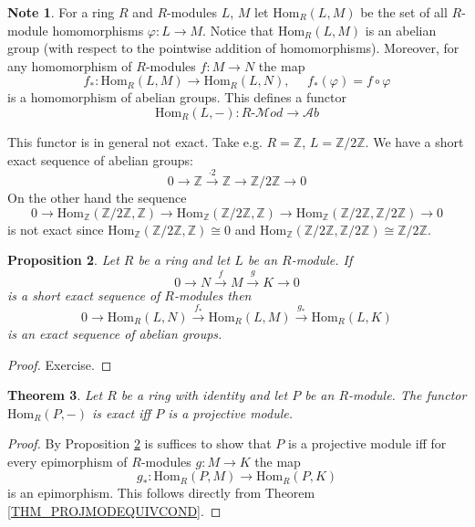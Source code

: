 \documentclass[12pt, letterpaper, oneside]{article}
\theoremstyle{plain}
\newtheorem{theorem}{Theorem}[section]
\newtheorem{proposition}[theorem]{Proposition}
\theoremstyle{definition}
\newtheorem{note}[theorem]{Note}
\newcommand{\lra}{\longrightarrow}
\newcommand{\Z}{{\mathbb Z}}
\newcommand{\Hom}{\mathrm{Hom}}
\newcommand{\Ab}{{\mathcal Ab}}
\newcommand{\Mod}{{\mathcal Mod}}
\newcommand{\vs}{\vskip 5mm}
\begin{document}
\vs\vs



\begin{note}
For  a ring $R$ and $R$-modules  $L$, $M$ let $\Hom_{R}(L, M)$ be the set  
of all $R$-module homomorphisms $\varphi\colon L \to M$. Notice that  $\Hom_{R}(L, M)$
is an abelian group (with respect to the pointwise addition of homomorphisms). Moreover, 
for any homomorphism of $R$-modules $f\colon M \to N$ the map 
$$f_{\ast}\colon \Hom_{R}(L, M) \to \Hom_{R}(L, N), \ \ \ \ \ \ f_{\ast}(\varphi) =  f \circ \varphi$$
is a homomorphism of abelian groups. 
This defines  a functor
$$\Hom_{R}(L, - )\colon  \text{$R$-$\Mod$} \lra \Ab$$

This functor is in general not exact. Take e.g. $R= \Z$, $L= \Z/2\Z$. We have a short 
exact sequence of abelian groups:
$$0\to \Z \overset{\cdot 2}{\lra} \Z \lra \Z/2\Z \to 0 $$
On the other hand the sequence 
$$0\to \Hom_{\Z}(\Z/2\Z, \Z) \lra \Hom_{\Z}(\Z/2\Z,\Z) \lra \Hom_{\Z}(\Z/2\Z,\Z/2\Z) \to 0 $$
is not exact since $ \Hom_{\Z}(\Z/2\Z, \Z) \cong 0$ and $\Hom_{\Z}(\Z/2\Z,\Z/2\Z)\cong \Z/2\Z$.
\end{note}



\vs\vs

\begin{proposition}
\label{PROP_HOML-LEFTEXACT}
Let $R$ be a ring and let $L$ be an $R$-module. If 
$$ 0 \lra N \overset{f}{\lra} M \overset{g}{\lra} K \lra 0$$
is a short exact sequence of $R$-modules then 
$$ 0 \lra \Hom_{R}(L, N) \overset{f_{\ast}}{\lra}  \Hom_{R}(L, M) \overset{g_{\ast}}{\lra}  \Hom_{R}(L, K)$$
is an exact sequence of abelian groups.
\end{proposition}


\vs

\begin{proof}
Exercise. 
\end{proof}


\vs\vs


\begin{theorem}
Let $R$ be a ring with identity and let  $P$ be an $R$-module. The functor 
$\Hom_{R}(P, - )$ is exact iff $P$ is a projective module.   
\end{theorem}

\vs

\begin{proof}
By Proposition \ref{PROP_HOML-LEFTEXACT} is suffices to show that $P$ is a projective 
module iff for every epimorphism of $R$-modules $g\colon M \to K$ the map 
$$g_{\ast}\colon \Hom_{R}(P, M) \lra \Hom_{R}(P, K)$$
is an epimorphism. This follows directly from Theorem \ref{THM_PROJMODEQUIVCOND}.
\end{proof}
\end{document}
